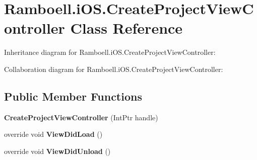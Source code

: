 \hypertarget{class_ramboell_1_1i_o_s_1_1_create_project_view_controller}{}\section{Ramboell.\+i\+O\+S.\+Create\+Project\+View\+Controller Class Reference}
\label{class_ramboell_1_1i_o_s_1_1_create_project_view_controller}


Inheritance diagram for Ramboell.\+i\+O\+S.\+Create\+Project\+View\+Controller\+:


Collaboration diagram for Ramboell.\+i\+O\+S.\+Create\+Project\+View\+Controller\+:
\subsection*{Public Member Functions}
\begin{DoxyCompactItemize}
\item 
\mbox{\label{class_ramboell_1_1i_o_s_1_1_create_project_view_controller_adc89920803eaa20748f02b6bb9d26a72}} 
{\bfseries Create\+Project\+View\+Controller} (Int\+Ptr handle)
\item 
\mbox{\label{class_ramboell_1_1i_o_s_1_1_create_project_view_controller_a3815d1674e094624048bb59374eb6e21}} 
override void {\bfseries View\+Did\+Load} ()
\item 
\mbox{\label{class_ramboell_1_1i_o_s_1_1_create_project_view_controller_acbf486e5f95b71086f532d7355ce357b}} 
override void {\bfseries View\+Did\+Unload} ()
\end{DoxyCompactItemize}
